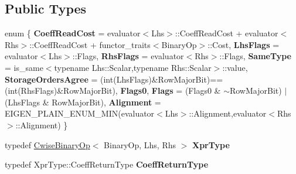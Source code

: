 \subsection*{Public Types}
\begin{DoxyCompactItemize}
\item 
\mbox{\label{struct_eigen_1_1internal_1_1binary__evaluator_3_01_cwise_binary_op_3_01_binary_op_00_01_lhs_00_009c1543c08828196fc8ade7d79a56c66_a973792c00c210e84d282db09dfc81a4d}} 
enum \{ \newline
{\bfseries Coeff\+Read\+Cost} = evaluator$<$Lhs$>$\+::Coeff\+Read\+Cost + evaluator$<$Rhs$>$\+::Coeff\+Read\+Cost + functor\+\_\+traits$<$Binary\+Op$>$\+::Cost, 
{\bfseries Lhs\+Flags} = evaluator$<$Lhs$>$\+::Flags, 
{\bfseries Rhs\+Flags} = evaluator$<$Rhs$>$\+::Flags, 
{\bfseries Same\+Type} = is\+\_\+same$<$typename Lhs\+::Scalar,typename Rhs\+::Scalar$>$\+::value, 
\newline
{\bfseries Storage\+Orders\+Agree} = (int(Lhs\+Flags)\&Row\+Major\+Bit)==(int(Rhs\+Flags)\&Row\+Major\+Bit), 
{\bfseries Flags0}, 
{\bfseries Flags} = (Flags0 \& $\sim$\+Row\+Major\+Bit) $\vert$ (Lhs\+Flags \& Row\+Major\+Bit), 
{\bfseries Alignment} = E\+I\+G\+E\+N\+\_\+\+P\+L\+A\+I\+N\+\_\+\+E\+N\+U\+M\+\_\+\+M\+IN(evaluator$<$Lhs$>$\+::Alignment,evaluator$<$Rhs$>$\+::Alignment)
 \}
\item 
\mbox{\label{struct_eigen_1_1internal_1_1binary__evaluator_3_01_cwise_binary_op_3_01_binary_op_00_01_lhs_00_009c1543c08828196fc8ade7d79a56c66_a8c97a698e57625386a888928bd9d4e2d}} 
typedef \mbox{\hyperlink{class_eigen_1_1_cwise_binary_op}{Cwise\+Binary\+Op}}$<$ Binary\+Op, Lhs, Rhs $>$ {\bfseries Xpr\+Type}
\item 
\mbox{\label{struct_eigen_1_1internal_1_1binary__evaluator_3_01_cwise_binary_op_3_01_binary_op_00_01_lhs_00_009c1543c08828196fc8ade7d79a56c66_aad152cbdb60b334a5764e945d3fb840f}} 
typedef Xpr\+Type\+::\+Coeff\+Return\+Type {\bfseries Coeff\+Return\+Type}
\end{DoxyCompactItemize}
